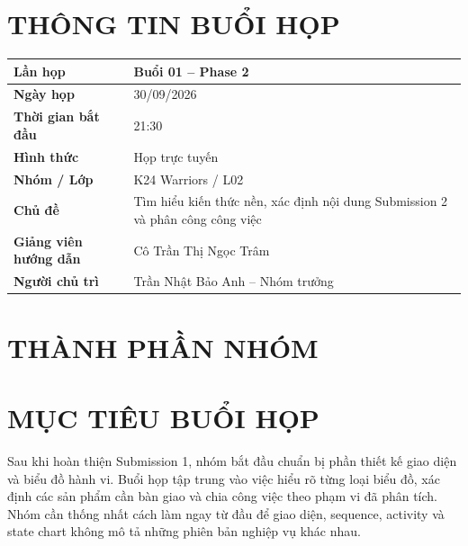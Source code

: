 \documentclass[10pt,a4paper]{article}
\begin{document}
\MakeHCMUTCover

\section{THÔNG TIN BUỔI HỌP}
\begin{center}
\begin{tabularx}{\textwidth}{|>{\bfseries}L{43mm}|Y|}
  \hline
  Lần họp & Buổi 01 -- Phase 2\\\hline
  Ngày họp & 30/09/2026\\\hline
  Thời gian bắt đầu & 21:30\\\hline
  Hình thức & Họp trực tuyến\\\hline
  Nhóm / Lớp & K24 Warriors / L02\\\hline
  Chủ đề & Tìm hiểu kiến thức nền, xác định nội dung Submission 2 và phân công công việc\\\hline
  Giảng viên hướng dẫn & Cô Trần Thị Ngọc Trâm\\\hline
  Người chủ trì & Trần Nhật Bảo Anh -- Nhóm trưởng\\\hline
\end{tabularx}
\end{center}

\section{THÀNH PHẦN NHÓM}
\begin{HCMUTMemberTable}
\end{HCMUTMemberTable}

\section{MỤC TIÊU BUỔI HỌP}
Sau khi hoàn thiện Submission 1, nhóm bắt đầu chuẩn bị phần thiết kế giao diện và biểu đồ hành vi. Buổi họp tập trung vào việc hiểu rõ từng loại biểu đồ, xác định các sản phẩm cần bàn giao và chia công việc theo phạm vi đã phân tích. Nhóm cần thống nhất cách làm ngay từ đầu để giao diện, sequence, activity và state chart không mô tả những phiên bản nghiệp vụ khác nhau.
\end{document}
